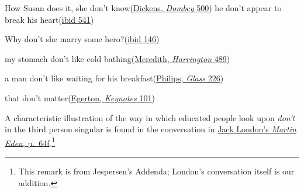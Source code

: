\ea \label{ex:11-79}
\ea How Susan does it, she don't know\hfill(\href{https://archive.org/details/dombeyson00dick_0/page/776/mode/2up?q=%22how+susan+does+it%22&view=theater}{Dickens, \textit{Dombey} 500})
\ex he don't appear to break his heart\hfill(\href{https://archive.org/details/dombeyson00dick_0/page/842/mode/2up?q=%22he+don%27t+appear%22&view=theater}{ibid 541}) 
\z \z

\ea \label{ex:11-81}
Why don't she marry some hero?\hfill(\href{https://archive.org/details/hypatia00kinggoog/page/n192/mode/2up?q=%22why+don%27t+she%22&view=theater}{ibid 146}) %
\z

\ea \label{ex:11-82}
my stomach don't like cold bathing\hfill(\href{https://archive.org/details/evanharringtonno00mererich/page/444/mode/2up?q=%22my+stomach+don%27t%22&view=theater}{Meredith, \textit{Harrington} 489})
\z

\ea \label{ex:11-83}
a man don't like waiting for his breakfast\hfill(\href{https://archive.org/details/asinalookinggla00philgoog/page/n230/mode/2up?q=%22man+don%27t+like+waiting%22&view=theater}{Philips, \textit{Glass} 226})
\z

\ea \label{ex:11-84}
that don't matter\hfill(\href{https://archive.org/details/b29012612/page/108/mode/2up?q=%22that+don%27t+matter%22&view=theater}{Egerton, \textit{Keynotes} 101})
\z

A characteristic illustration of the way in which educated people look upon \textit{don't} in the third person singular is found in the conversation in \href{https://archive.org/details/martineden00lond/page/62/mode/2up?q=%22But+it+don%27t+mean%22&view=theater}{Jack London's \textit{Martin Eden}, p.~64f}.\footnote{This remark is from Jespersen's Addenda; London's conversation itself is our addition. \eds} %

